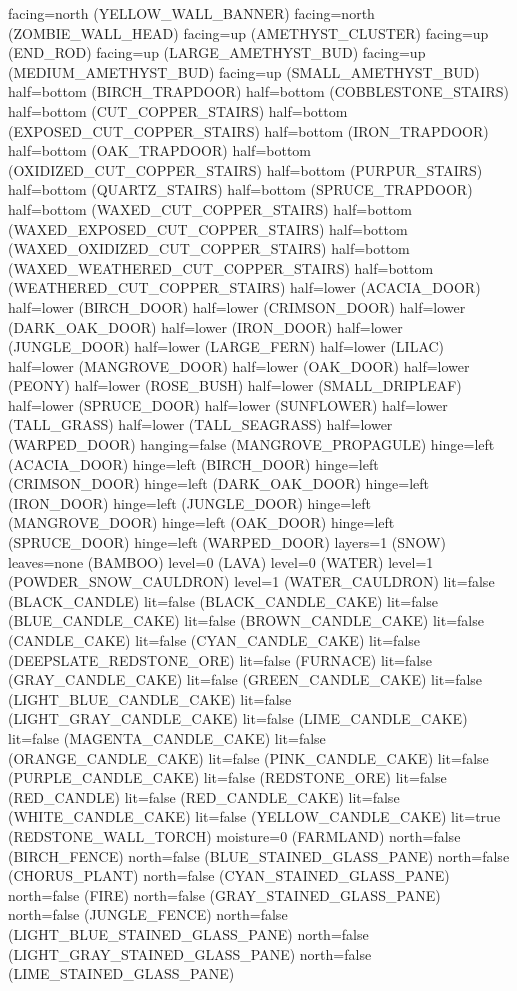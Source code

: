 \documentclass[11pt]{article}
\begin{document}
facing=north (YELLOW_WALL_BANNER)
facing=north (ZOMBIE_WALL_HEAD)
facing=up (AMETHYST_CLUSTER)
facing=up (END_ROD)
facing=up (LARGE_AMETHYST_BUD)
facing=up (MEDIUM_AMETHYST_BUD)
facing=up (SMALL_AMETHYST_BUD)
half=bottom (BIRCH_TRAPDOOR)
half=bottom (COBBLESTONE_STAIRS)
half=bottom (CUT_COPPER_STAIRS)
half=bottom (EXPOSED_CUT_COPPER_STAIRS)
half=bottom (IRON_TRAPDOOR)
half=bottom (OAK_TRAPDOOR)
half=bottom (OXIDIZED_CUT_COPPER_STAIRS)
half=bottom (PURPUR_STAIRS)
half=bottom (QUARTZ_STAIRS)
half=bottom (SPRUCE_TRAPDOOR)
half=bottom (WAXED_CUT_COPPER_STAIRS)
half=bottom (WAXED_EXPOSED_CUT_COPPER_STAIRS)
half=bottom (WAXED_OXIDIZED_CUT_COPPER_STAIRS)
half=bottom (WAXED_WEATHERED_CUT_COPPER_STAIRS)
half=bottom (WEATHERED_CUT_COPPER_STAIRS)
half=lower (ACACIA_DOOR)
half=lower (BIRCH_DOOR)
half=lower (CRIMSON_DOOR)
half=lower (DARK_OAK_DOOR)
half=lower (IRON_DOOR)
half=lower (JUNGLE_DOOR)
half=lower (LARGE_FERN)
half=lower (LILAC)
half=lower (MANGROVE_DOOR)
half=lower (OAK_DOOR)
half=lower (PEONY)
half=lower (ROSE_BUSH)
half=lower (SMALL_DRIPLEAF)
half=lower (SPRUCE_DOOR)
half=lower (SUNFLOWER)
half=lower (TALL_GRASS)
half=lower (TALL_SEAGRASS)
half=lower (WARPED_DOOR)
hanging=false (MANGROVE_PROPAGULE)
hinge=left (ACACIA_DOOR)
hinge=left (BIRCH_DOOR)
hinge=left (CRIMSON_DOOR)
hinge=left (DARK_OAK_DOOR)
hinge=left (IRON_DOOR)
hinge=left (JUNGLE_DOOR)
hinge=left (MANGROVE_DOOR)
hinge=left (OAK_DOOR)
hinge=left (SPRUCE_DOOR)
hinge=left (WARPED_DOOR)
layers=1 (SNOW)
leaves=none (BAMBOO)
level=0 (LAVA)
level=0 (WATER)
level=1 (POWDER_SNOW_CAULDRON)
level=1 (WATER_CAULDRON)
lit=false (BLACK_CANDLE)
lit=false (BLACK_CANDLE_CAKE)
lit=false (BLUE_CANDLE_CAKE)
lit=false (BROWN_CANDLE_CAKE)
lit=false (CANDLE_CAKE)
lit=false (CYAN_CANDLE_CAKE)
lit=false (DEEPSLATE_REDSTONE_ORE)
lit=false (FURNACE)
lit=false (GRAY_CANDLE_CAKE)
lit=false (GREEN_CANDLE_CAKE)
lit=false (LIGHT_BLUE_CANDLE_CAKE)
lit=false (LIGHT_GRAY_CANDLE_CAKE)
lit=false (LIME_CANDLE_CAKE)
lit=false (MAGENTA_CANDLE_CAKE)
lit=false (ORANGE_CANDLE_CAKE)
lit=false (PINK_CANDLE_CAKE)
lit=false (PURPLE_CANDLE_CAKE)
lit=false (REDSTONE_ORE)
lit=false (RED_CANDLE)
lit=false (RED_CANDLE_CAKE)
lit=false (WHITE_CANDLE_CAKE)
lit=false (YELLOW_CANDLE_CAKE)
lit=true (REDSTONE_WALL_TORCH)
moisture=0 (FARMLAND)
north=false (BIRCH_FENCE)
north=false (BLUE_STAINED_GLASS_PANE)
north=false (CHORUS_PLANT)
north=false (CYAN_STAINED_GLASS_PANE)
north=false (FIRE)
north=false (GRAY_STAINED_GLASS_PANE)
north=false (JUNGLE_FENCE)
north=false (LIGHT_BLUE_STAINED_GLASS_PANE)
north=false (LIGHT_GRAY_STAINED_GLASS_PANE)
north=false (LIME_STAINED_GLASS_PANE)
\end{document}
